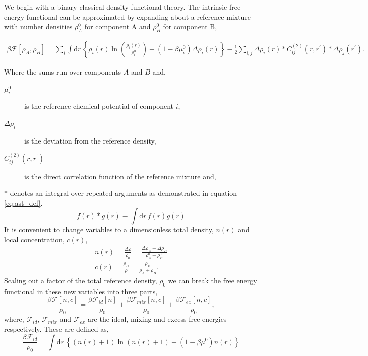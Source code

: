\documentclass[showkeys, prb, reprint]{revtex4-1}
\newcommand{\F}{\mathcal{F}}    %
\renewcommand{\l}{\left}        %
\renewcommand{\r}{\right}       %
\newcommand{\f}{\frac}          %
\newcommand{\A}{\rho_A}         %
\newcommand{\B}{\rho_B}         %
\newcommand{\integrate}[1]{\int \mathrm{d}#1\,}
\begin{document}
We begin with a binary classical density functional theory. The intrinsic free
energy functional can be approximated by expanding about a reference mixture
with number densities $\rho_A^0$ for component A and $\rho_B^0$ for component
B,
\begin{widetext}
%
\begin{gather}\label{binary_cdft_free_energy}
    \beta\F[\A, \B] = \sum_{i} \integrate{r} 
        \l\lbrace \rho_i(r) \ln\l(\f{\rho_i(r)}{\rho_i^0}\r) 
        - (1 - \beta\mu_i^0)\Delta\rho_i(r) \r\rbrace
    - \f{1}{2} \sum_{i,j} \Delta\rho_i(r) \ast C^{(2)}_{ij}(r, r^\prime) 
        \ast \Delta\rho_j(r^\prime). 
\end{gather}
%
\end{widetext}
Where the sums run over components $A$ and $B$ and,
\begin{description}
    \item[$\mu_i^0$] is the reference chemical potential of component $i$,
    \item[$\Delta\rho_i$] is the deviation from the reference density,
    \item[$C^{(2)}_{ij}(r, r^\prime)$] is the direct correlation function
        of the reference mixture and,
\end{description}
%
$\ast$ denotes an integral over repeated arguments as demonstrated
in equation \ref{eq:ast_def}.
%
\begin{equation}
    \label{eq:ast_def}
    f(r) \ast g(r) \equiv \integrate{r} f(r) g(r)
\end{equation}
%
It is convenient to change variables to a dimensionless total density, $n(r)$
and local concentration, $c(r)$,
%
\begin{gather}
    n(r) = \f{\Delta \rho}{\rho_0} = \f{\Delta\A + \Delta\B}{\A^0 + \B^0} \\
    c(r) = \f{\B}{\rho} = \f{\B}{\A + \B}.
\end{gather}
%
Scaling out a factor of the total reference density, $\rho_0$ we can break the
free energy functional in these new variables into three parts,
%
\begin{equation}
    \label{binary_total_free_energy}
    \f{\beta\F[n, c]}{\rho_0} = \f{\beta\F_{id}[n]}{\rho_0} 
        + \f{\beta\F_{mix}[n, c]}{\rho_0}
        + \f{\beta\F_{ex}[n, c]}{\rho_0},
\end{equation}
%
where, $\F_{id}$, $\F_{mix}$ and $\F_{ex}$ are the ideal, mixing and excess
free energies respectively. These are defined as,
%
\begin{equation}
    \label{binary_ideal}
    \f{\beta\F_{id}}{\rho_0} =
        \int \mathrm{d}r \,\l\lbrace (n(r) + 1)\ln(n(r) + 1) 
        - (1 - \beta\mu^0)n(r) \r\rbrace
\end{equation}
\end{document}
